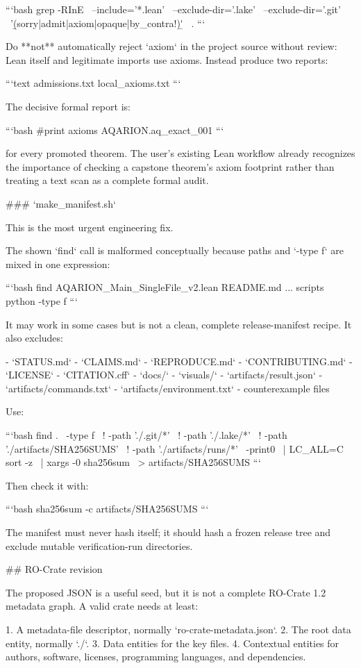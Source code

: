 ```bash
grep -RInE \
  --include='*.lean' \
  --exclude-dir='.lake' \
  --exclude-dir='.git' \
  '\b(sorry|admit|axiom|opaque|by_contra!)\b' \
  .
```

Do **not** automatically reject `axiom` in the project source without review: Lean itself and legitimate imports use axioms. Instead produce two reports:

```text
admissions.txt
local_axioms.txt
```

The decisive formal report is:

```bash
#print axioms AQARION.aq_exact_001
```

for every promoted theorem. The user’s existing Lean workflow already recognizes the importance of checking a capstone theorem’s axiom footprint rather than treating a text scan as a complete formal audit. 

### `make_manifest.sh`

This is the most urgent engineering fix.

The shown `find` call is malformed conceptually because paths and `-type f` are mixed in one expression:

```bash
find AQARION_Main_SingleFile_v2.lean README.md ... scripts python -type f
```

It may work in some cases but is not a clean, complete release-manifest recipe. It also excludes:

- `STATUS.md`
- `CLAIMS.md`
- `REPRODUCE.md`
- `CONTRIBUTING.md`
- `LICENSE`
- `CITATION.cff`
- `docs/`
- `visuals/`
- `artifacts/result.json`
- `artifacts/commands.txt`
- `artifacts/environment.txt`
- counterexample files

Use:

```bash
find . \
  -type f \
  ! -path './.git/*' \
  ! -path './.lake/*' \
  ! -path './artifacts/SHA256SUMS' \
  ! -path './artifacts/runs/*' \
  -print0 \
| LC_ALL=C sort -z \
| xargs -0 sha256sum \
> artifacts/SHA256SUMS
```

Then check it with:

```bash
sha256sum -c artifacts/SHA256SUMS
```

The manifest must never hash itself; it should hash a frozen release tree and exclude mutable verification-run directories.

## RO-Crate revision

The proposed JSON is a useful seed, but it is not a complete RO-Crate 1.2 metadata graph. A valid crate needs at least:

1. A metadata-file descriptor, normally `ro-crate-metadata.json`.
2. The root data entity, normally `./`.
3. Data entities for the key files.
4. Contextual entities for authors, software, licenses, programming languages, and dependencies.

